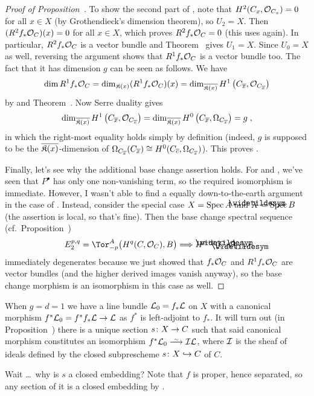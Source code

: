 \documentclass[a4paper,parskip=half,numbers=enddot, DIV=12]{scrreprt}
\begin{document}
\begin{proof}[Proof of Proposition~]
	To show the second part of , note that $H^2(C_x,\mathcal{O}_{C_x})=0$ for all $x\in X$ (by Grothendieck's dimension theorem), so $U_2=X$. Then $(R^2f_*\mathcal{O}_C)(x)=0$ for all $x\in X$, which proves $R^2f_*\mathcal{O}_C=0$ (this uses \cite[Lemma~1.5.1]{alg2} again). In particular, $R^2f_*\mathcal{O}_C$ is a vector bundle and Theorem~ gives $U_1=X$. Since $U_0=X$ as well, reversing the argument shows that $R^1f_*\mathcal{O}_C$ is a vector bundle too. The fact that it has dimension $g$ can be seen as follows. We have
	\begin{align*}
		\dim R^1f_*\mathcal{O}_C=\dim_{\mathfrak{K}(x)}(R^1f_*\mathcal{O}_C)(x)=\dim_{\overline{\mathfrak{K}(x)}}H^1\left(C_{\overline{x}},\mathcal{O}_{C_{\overline{x}}}\right)
	\end{align*}
	by  and Theorem~. Now Serre duality gives
	\begin{align*}
		\dim_{\overline{\mathfrak{K}(x)}}H^1\left(C_{\overline{x}},\mathcal{O}_{C_{\overline{x}}}\right)=\dim_{\overline{\mathfrak{K}(x)}}H^0\left(C_{\overline{x}},\Omega_{C_{\overline{x}}}\right)=g\;,
	\end{align*}
	in which the right-most equality holds simply by definition (indeed, $g$ is supposed to be the $\overline{\mathfrak{K}(x)}$-dimension of $\Omega_{C_{\overline{x}}}(C_{\overline{x}})\cong H^0(C_{\overline{c}},\Omega_{C_{\overline{x}}})$). This proves .
	
	Finally, let's see why the additional base change assertion holds. For  and , we've seen that $P^\bullet$ has only one non-vanishing term, so the required isomorphism is immediate. However, I wasn't able to find a equally down-to-the-earth argument in the case of . Instead, consider the special case $X=\operatorname{Spec} A$ and $\snake{X}=\Spec B$ (the assertion is local, so that's fine). Then the base change spectral sequence (cf.\ Proposition~)
	\begin{align*}
		E_2^{p,q}=\Tor_{-p}^A\big(H^q(C,\Oo_C),B\big)\converge H^{p+q}(\snake{C},\Oo_{\snake{C}})\;.
	\end{align*}
	immediately degenerates because we just showed that $f_*\mathcal{O}_C$ and $R^1f_*\mathcal{O}_C$ are vector bundles (and the higher derived images vanish anyway), so the base change morphism is an isomorphism in this case as well.
\end{proof}
\begin{rem}
	When $g=d=1$ we have a line bundle $\mathcal{L}_0=f_*\mathcal{L}$ on $X$ with a canonical morphism $f^*\Ll_0=f^*f_*\Ll\morphism\Ll$ as $f^*$ is left-adjoint to $f_*$. It will turn out (in Proposition~) there is a unique section $s\colon X\morphism C$ such that said canonical morphism constitutes an isomorphism $f^*\Ll_0\isomorphism\Ii\Ll$, where $\mathcal{I}$ is the sheaf of ideals defined by the closed subprescheme $s\colon X\monomorphism C$ of $C$.
	
	Wait \ldots\ why is $s$ a closed embedding? Note that $f$ is proper, hence separated, so any section of it is a closed embedding by \cite[Proposition~1.5.5]{alggeo1}.
\end{rem}
\end{document}
